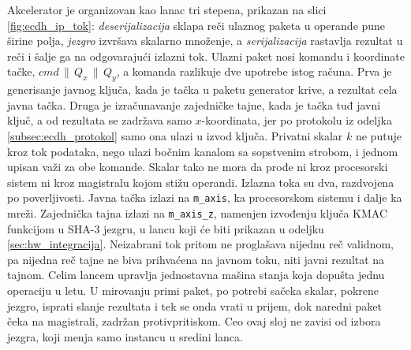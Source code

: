 Akcelerator je organizovan kao lanac tri stepena, prikazan na slici \ref{fig:ecdh_ip_tok}: \textit{deserijalizacija} sklapa reči ulaznog paketa u operande pune širine polja, \textit{jezgro} izvršava skalarno množenje, a \textit{serijalizacija} rastavlja rezultat u reči i šalje ga na odgovarajući izlazni tok. Ulazni paket nosi komandu i koordinate tačke, $\mathit{cmd} \,\|\, Q_x \,\|\, Q_y$, a komanda razlikuje dve upotrebe istog računa. Prva je generisanje javnog ključa, kada je tačka u paketu generator krive, a rezultat cela javna tačka. Druga je izračunavanje zajedničke tajne, kada je tačka tuđ javni ključ, a od rezultata se zadržava samo $x$-koordinata, jer po protokolu iz odeljka \ref{subsec:ecdh_protokol} samo ona ulazi u izvod ključa.
\smallbreak
Privatni skalar $k$ ne putuje kroz tok podataka, nego ulazi bočnim kanalom sa sopstvenim strobom, i jednom upisan važi za obe komande. Skalar tako ne mora da prođe ni kroz procesorski sistem ni kroz magistralu kojom stižu operandi.
\smallbreak
Izlazna toka su dva, razdvojena po poverljivosti. Javna tačka izlazi na \texttt{m\_axis}, ka procesorskom sistemu i dalje ka mreži. Zajednička tajna izlazi na \texttt{m\_axis\_z}, namenjen izvođenju ključa KMAC funkcijom u SHA-3 jezgru, u lancu koji će biti prikazan u odeljku \ref{sec:hw_integracija}. Neizabrani tok pritom ne proglašava nijednu reč validnom, pa nijedna reč tajne ne biva prihvaćena na javnom toku, niti javni rezultat na tajnom. Celim lancem upravlja jednostavna mašina stanja koja dopušta jednu operaciju u letu. U mirovanju primi paket, po potrebi sačeka skalar, pokrene jezgro, isprati slanje rezultata i tek se onda vrati u prijem, dok naredni paket čeka na magistrali, zadržan protivpritiskom. Ceo ovaj sloj ne zavisi od izbora jezgra, koji menja samo instancu u sredini lanca.

